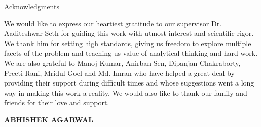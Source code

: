 \begin{center}
\LARGE{Acknowledgments} 
\end{center}

\vspace{0.5in}

We would like to express our heartiest gratitude to our supervisor Dr. Aaditeshwar Seth for guiding this work with utmost interest and scientific rigor. We thank him for setting high standards, giving us freedom to explore multiple facets of the problem and teaching us value of analytical thinking and hard work. We are also grateful to Manoj Kumar, Anirban Sen, Dipanjan Chakraborty, Preeti Rani, Mridul Goel and Md. Imran who have helped a great deal by providing their support during difficult times and whose suggestions went a long way in making this work a reality. We would also like to thank our family and friends for their love and support.\\

\vspace{1.5in}

{\bfseries ABHISHEK AGARWAL}

